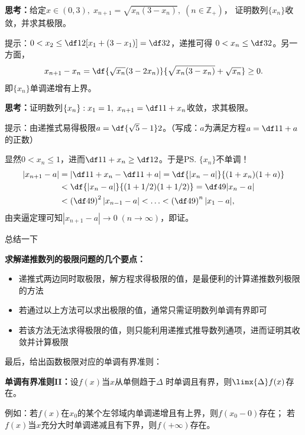 \bs
{\bf 思考：}给定$x\in(0,3),\; x_{n+1}=\sqrt{x_n(3-x_n)},
\;(n\in\mathbb{Z}_+)$，
证明数列$\{x_n\}$收敛，并求其极限。

\ifhint
提示：$0<x_2\leq\df12[x_1+(3-x_1)]=\df32$，递推可得
$0<x_n\leq\df32$。另一方面，
$$x_{n+1}-x_n=\df{\sqrt{x_n}(3-2x_n)}{\sqrt{x_n(3-x_n)}
+\sqrt{x_n}}\geq 0.$$
即$\{x_n\}$单调递增有上界。
\fi

\bs
{\bf 思考：}证明数列$\{x_n\}:x_1=1,\;x_{n+1}
=\df1{1+x_n}$收敛，求其极限。

\ifhint
提示：由递推式易得极限$a=\df{\sqrt5-1}2$。（写成：$a$为满足方程$a=\df1{1+a}$的正数）

显然$0<x_n\leq1$，进而$\df1{1+x_n}\geq\df12$。于是\ps{$\{x_n\}$不单调！}
\begin{align}
	|x_{n+1}-a|&=\left|\df1{1+x_n}-\df1{1+a}\right|=\df{|x_n-a|}{(1+x_n)(1+a)}\notag\\
	&<\df{|x_n-a|}{(1+1/2)(1+1/2)}=\df49|x_n-a|\notag\\
	&<\left(\df49\right)^2|x_{n-1}-a|<\ldots<\left(\df49\right)^{n}|x_1-a|,\notag
\end{align}
由夹逼定理可知$|x_{n+1}-a|\to0\;(n\to\infty)$，即证。
\fi

总结一下
\begin{thx}
	{\bf 求解递推数列的极限问题的几个要点：}
	\begin{itemize}
	  \item 递推式两边同时取极限，解方程求得极限的值，是最便利的计算递推数列极限的方法
	  \item 若通过以上方法可以求出极限的值，通常只需证明数列单调有界即可
	  \item 若该方法无法求得极限的值，则只能利用递推式推导数列通项，进而证明其收敛并计算极限
	\end{itemize}
\end{thx}

最后，给出函数极限对应的单调有界准则：
\begin{thx}
{\bf 单调有界准则II：}设$f(x)$当$x$从单侧趋于$\Delta$
时单调且有界，则$\limx{\Delta}f(x)$存在。
\end{thx}

例如：若$f(x)$在$x_0$的某个左邻域内单调递增且有上界，则$f(x_0-0)$存在；
若$f(x)$当$x$充分大时单调递减且有下界，则$f(+\infty)$存在。

